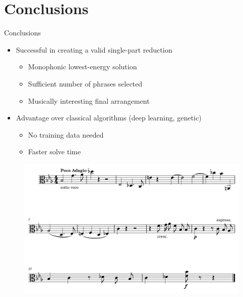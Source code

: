 \documentclass[handout]{beamer}
\begin{document}
\section{Conclusions}

\begin{frame}{Conclusions}
    \begin{itemize}[<+->]
        \item Successful in creating a valid single-part reduction
        \begin{itemize}
            \item Monophonic lowest-energy solution
            \item Sufficient number of phrases selected
            \item Musically interesting final arrangement
        \end{itemize}
        \item Advantage over classical algorithms (deep learning, genetic)
        \begin{itemize}
            \item No training data needed
            \item Faster solve time \cite{huang_towards_2012}
        \end{itemize}
    \end{itemize}
    \begin{figure}
        \includegraphics[width=.5\linewidth]{../Figures/arrangement-1.png}
    \end{figure}
\end{frame}
\end{document}
